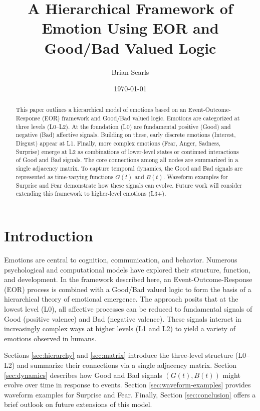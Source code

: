 \documentclass[11pt]{article}
\title{A Hierarchical Framework of Emotion Using EOR and Good/Bad Valued Logic}
\author{Brian Searls}
\date{\today}
\begin{document}
\maketitle

\begin{abstract}
This paper outlines a hierarchical model of emotions based on an Event-Outcome-Response (EOR) framework and Good/Bad valued logic. Emotions are categorized at three levels (L0--L2). At the foundation (L0) are fundamental positive (Good) and negative (Bad) affective signals. Building on these, early discrete emotions (Interest, Disgust) appear at L1. Finally, more complex emotions (Fear, Anger, Sadness, Surprise) emerge at L2 as combinations of lower-level states or continued interactions of Good and Bad signals. The core connections among all nodes are summarized in a single adjacency matrix. To capture temporal dynamics, the Good and Bad signals are represented as time-varying functions \(G(t)\) and \(B(t)\). Waveform examples for Surprise and Fear demonstrate how these signals can evolve. Future work will consider extending this framework to higher-level emotions (L3+).
\end{abstract}

\tableofcontents

\section{Introduction}
Emotions are central to cognition, communication, and behavior. Numerous psychological and computational models have explored their structure, function, and development. In the framework described here, an Event-Outcome-Response (EOR) process is combined with a Good/Bad valued logic to form the basis of a hierarchical theory of emotional emergence. The approach posits that at the lowest level (L0), all affective processes can be reduced to fundamental signals of Good (positive valence) and Bad (negative valence). These signals interact in increasingly complex ways at higher levels (L1 and L2) to yield a variety of emotions observed in humans.

Sections \ref{sec:hierarchy} and \ref{sec:matrix} introduce the three-level structure (L0--L2) and summarize their connections via a single adjacency matrix. Section \ref{sec:dynamics} describes how Good and Bad signals \((G(t), B(t))\) might evolve over time in response to events. Section \ref{sec:waveform-examples} provides waveform examples for Surprise and Fear. Finally, Section \ref{sec:conclusion} offers a brief outlook on future extensions of this model.
\end{document}
